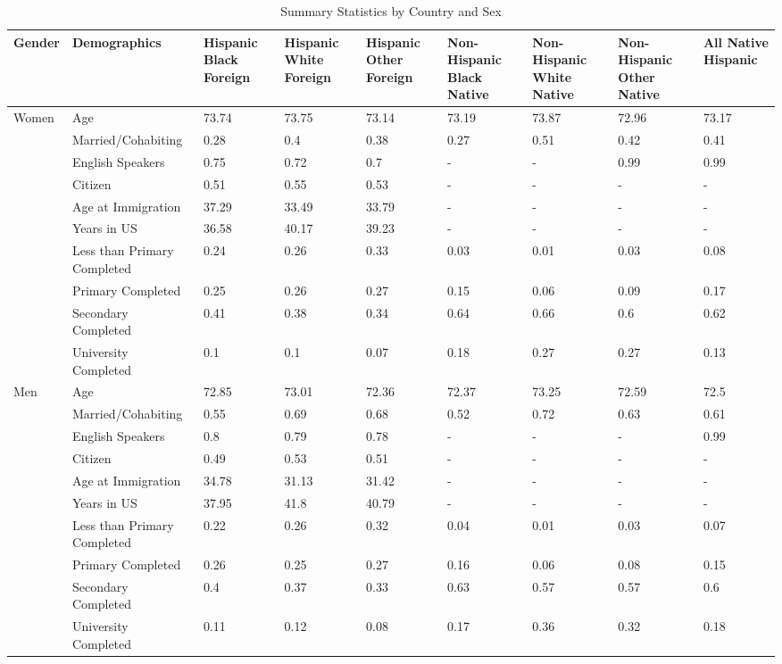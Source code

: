 \documentclass[
]{article}
\begin{document}
\begin{landscape}
\begin{table}[ht]
\centering
\caption{Summary Statistics by Country and Sex} 
\begingroup\small
\begin{tabular}{l|l|p{1.5cm}p{1.5cm}p{1.5cm}p{1.5cm}p{1.5cm}p{1.5cm}p{1.5cm}}
  \hline
Gender & Demographics & Hispanic Black Foreign & Hispanic White Foreign & Hispanic Other Foreign & Non-Hispanic Black Native & Non-Hispanic White Native & Non-Hispanic Other Native & All Native Hispanic \\ 
  \hline
Women & Age & 73.74 & 73.75 & 73.14 & 73.19 & 73.87 & 72.96 & 73.17 \\ 
   & Married/Cohabiting & 0.28 & 0.4 & 0.38 & 0.27 & 0.51 & 0.42 & 0.41 \\ 
   & English Speakers & 0.75 & 0.72 & 0.7 & - & - & 0.99 & 0.99 \\ 
   & Citizen & 0.51 & 0.55 & 0.53 & - & - & - & - \\ 
   & Age at Immigration & 37.29 & 33.49 & 33.79 & - & - & - & - \\ 
   & Years in US & 36.58 & 40.17 & 39.23 & - & - & - & - \\ 
   & Less than Primary Completed & 0.24 & 0.26 & 0.33 & 0.03 & 0.01 & 0.03 & 0.08 \\ 
   & Primary Completed & 0.25 & 0.26 & 0.27 & 0.15 & 0.06 & 0.09 & 0.17 \\ 
   & Secondary Completed & 0.41 & 0.38 & 0.34 & 0.64 & 0.66 & 0.6 & 0.62 \\ 
   & University Completed & 0.1 & 0.1 & 0.07 & 0.18 & 0.27 & 0.27 & 0.13 \\ 
  Men & Age & 72.85 & 73.01 & 72.36 & 72.37 & 73.25 & 72.59 & 72.5 \\ 
   & Married/Cohabiting & 0.55 & 0.69 & 0.68 & 0.52 & 0.72 & 0.63 & 0.61 \\ 
   & English Speakers & 0.8 & 0.79 & 0.78 & - & - & - & 0.99 \\ 
   & Citizen & 0.49 & 0.53 & 0.51 & - & - & - & - \\ 
   & Age at Immigration & 34.78 & 31.13 & 31.42 & - & - & - & - \\ 
   & Years in US & 37.95 & 41.8 & 40.79 & - & - & - & - \\ 
   & Less than Primary Completed & 0.22 & 0.26 & 0.32 & 0.04 & 0.01 & 0.03 & 0.07 \\ 
   & Primary Completed & 0.26 & 0.25 & 0.27 & 0.16 & 0.06 & 0.08 & 0.15 \\ 
   & Secondary Completed & 0.4 & 0.37 & 0.33 & 0.63 & 0.57 & 0.57 & 0.6 \\ 
   & University Completed & 0.11 & 0.12 & 0.08 & 0.17 & 0.36 & 0.32 & 0.18 \\ 
   \hline
\end{tabular}
\endgroup
\end{table}

\end{landscape}
\end{document}
